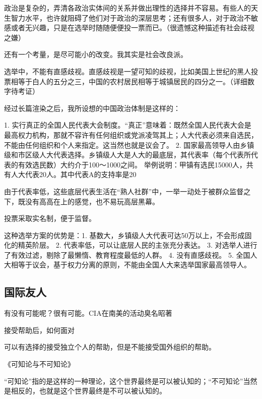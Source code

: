 政治是复杂的，弄清各政治实体间的关系并做出理性的选择并不容易。有些人的天生智力水平，也许就阻碍了他们对于政治的深层思考；还有很多人，对于政治不敏感或者无兴趣，只是在选举时随随便便投一票而已。（很遗憾这种描述有社会歧视之嫌）

还有一个考量，是尽可能小的改变。我其实是社会改良派。

选举中，不能有直感歧视。直感歧视是一望可知的歧视，比如美国上世纪的黑人投票相等于白人的五分之三，中国的农村居民相等于城镇居民的四分之一。（详细数字待考证）

经过长篇渲染之后，我所设想的中国政治体制是这样的：

1. 实行真正的全国人民代表大会制度。“真正”意味着：既然全国人民代表大会是最高权力机构，那就不容许有任何组织或党派凌驾其上；人大代表必须来自选民，不能由任何组织和个人来指定。这当然也就是议会了。
2. 国家最高领导人由乡镇级和市区级人大代表选择。乡镇级人大是人大的最底层，其代表率（每个代表所代表的有效选民数）大约介于100～1000之间。
举例说明：甲镇有选民15000人，共有人大代表20人。其中代表A的支持率是20%

由于代表率低，这些底层代表生活在“熟人社群”中，一举一动处于被群众监督之下，既没有高高在上的感觉，也不易玩高层黑幕。

投票采取实名制，便于监督。

这种选举方案的优势是：1. 基数大，乡镇级人大代表可达50万以上，不会形成固化的精英阶层。 2. 代表率低，可以让底层人民的主张充分表达。 3. 对选举人进行了有效过滤，剔除了最懒惰、教育程度最低的人群。 4. 没有直感歧视。 5. 全国人大相等于议会，基于权力分离的原则，不能由全国人大来选举国家最高领导人。

\subsection{国际友人}


有没有可能呢？很有可能。CIA在南美的活动臭名昭著

接受帮助后，如何面对


可以有选择的接受独立个人的帮助，但是不能接受国外组织的帮助。



《可知论与不可知论》

“可知论”指的是这样的一种理论，这个世界最终是可以被认知的；“不可知论”当然是相反的，也就是这个世界最终是不可以被认知的。


